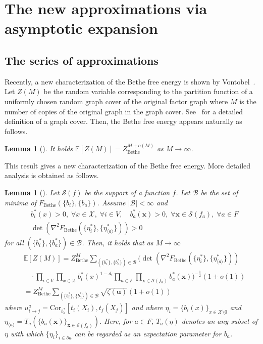 \documentclass[a4paper,10pt,twoside,twocolumn,openany,final]{memoir}
\newcommand{\Cor}{\mathrm{Cor}}
\theoremstyle{plain}
\newtheorem{lemma}[theorem]{Lemma}
\theoremstyle{definition}
\theoremstyle{remark}
\begin{document}
\section{The new approximations via asymptotic expansion}\label{sec:new}
\subsection{The series of approximations}
Recently, a new characterization of the Bethe free energy is shown by Vontobel~\cite{vontobel2010counting}.
Let $Z(M)$ be the random variable
corresponding to the partition function of a uniformly chosen random graph cover of the original factor graph
where $M$ is the number of copies of the original graph in the graph cover.
See~\cite{vontobel2010counting} for a detailed definition of a graph cover.
Then, the Bethe free energy appears naturally as follows.
\begin{lemma}[\cite{vontobel2010counting}]
It holds
$\mathbb{E}[Z(M)] = Z_\mathrm{Bethe}^{M + o(M)}$ as $M\to \infty$.
\end{lemma}
This result gives a new characterization of the Bethe free energy.
More detailed analysis is obtained as follows.
\begin{lemma}[\cite{mori2012central}]
Let $\mathcal{S}(f)$ be the support of a function $f$.
Let $\mathcal{B}$ be the set of minima of $F_\mathrm{Bethe}(\{b_i\}, \{b_a\})$.
Assume $|\mathcal{B}|<\infty$ and
\begin{align*}
&b^*_i(x)>0,\; \forall x\in\mathcal{X},\; \forall i\in V,\quad
b^*_a(\bm{x})>0,\; \forall\bm{x}\in\mathcal{S}(f_a),\; \forall a\in F\\
&\det\left(\nabla^2F_\mathrm{Bethe}(\{\eta^*_i\}, \{\eta^*_{\langle a\rangle}\})\right) >0
\end{align*}
for all $(\{b^*_i\}, \{b^*_a\})\in\mathcal{B}$.
Then, it holds that as $M\to\infty$
\begin{align*}
&\mathbb{E}[Z(M)] = Z_\mathrm{Bethe}^M\sum_{(\{b^*_i\}, \{b^*_a\})\in\mathcal{B}}
\Bigg(\det\left(\nabla^2F_\mathrm{Bethe}(\{\eta^*_i\}, \{\eta^*_{\langle a\rangle}\})\right)\\
&\quad\cdot \prod_{i\in V}\prod_{x\in\mathcal{X}}b_i^*(x)^{1-d_i}\prod_{a\in F}\prod_{\bm{x}\in\mathcal{S}(f_a)}b_a^*(\bm{x})\Bigg)^{-\frac12}
(1+o(1))\\
&=
Z_\mathrm{Bethe}^M\sum_{(\{b^*_i\}, \{b^*_a\})\in\mathcal{B}} \sqrt{\zeta(\bm{u})}(1+o(1))
\end{align*}
where $u_{i\to j}^a = \Cor_{b^*_a}[t_i(X_i), t_j(X_j)]$
and where 
$\eta_i=\{b_i(x)\}_{x\in\mathcal{X}\setminus 0}$
and
$\eta_{\langle a\rangle}=T_a(\{b_a(\bm{x})\}_{\bm{x}\in\mathcal{S}(f_a)})$.
Here, for $a\in F$, $T_a(\eta)$ denotes an any subset of $\eta$ with which $\{\eta_i\}_{i\in\partial a}$
can be regarded as an expectation parameter for $b_a$.
\end{lemma}
\end{document}

